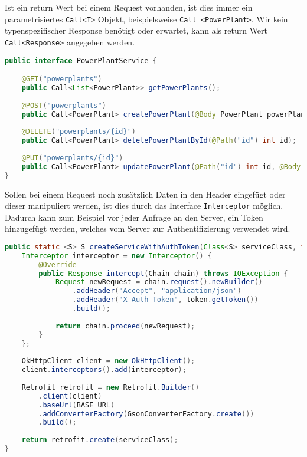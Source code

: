 Ist ein return Wert bei einem Request vorhanden, ist dies immer ein parametrisiertes \texttt{Call<T>} Objekt, beispielsweise \texttt{Call <PowerPlant>}. Wir kein typenspezifischer Response benötigt oder erwartet, kann als return Wert \texttt{Call<Response>} angegeben werden.
 
\begin{lstlisting}[language=java, caption={Auszug aus dem PowerPlantService},label={lst:retrofitPowerPlantService}, escapechar=|, numbers=none, frame=single]
public interface PowerPlantService {

	@GET("powerplants")
	public Call<List<PowerPlant>> getPowerPlants();
	
	@POST("powerplants")
	public Call<PowerPlant> createPowerPlant(@Body PowerPlant powerPlant);
	
	@DELETE("powerplants/{id}")
	public Call<PowerPlant> deletePowerPlantById(@Path("id") int id); |\label{line:path}|
	
	@PUT("powerplants/{id}")
	public Call<PowerPlant> updatePowerPlant(@Path("id") int id, @Body PowerPlant powerPlant); |\label{line:body}|
}
\end{lstlisting}

\newpage
Sollen bei einem Request noch zusätzlich Daten in den Header eingefügt oder dieser manipuliert werden, ist dies durch das Interface \texttt{Interceptor} möglich. Dadurch kann zum Beispiel vor jeder Anfrage an den Server, ein Token hinzugefügt werden, welches vom Server zur Authentifizierung verwendet wird.

\begin{lstlisting}[language=java, caption={Hinzufügen des Tokens, für gültigen Login},label={lst:addToken}, escapechar=|, frame=single]
public static <S> S createServiceWithAuthToken(Class<S> serviceClass, final AuthToken token) {
	Interceptor interceptor = new Interceptor() {
		@Override
		public Response intercept(Chain chain) throws IOException {
			Request newRequest = chain.request().newBuilder()
				.addHeader("Accept", "application/json")
				.addHeader("X-Auth-Token", token.getToken())
				.build();
		
			return chain.proceed(newRequest);
		}
	};
		
	OkHttpClient client = new OkHttpClient();
	client.interceptors().add(interceptor);
		
	Retrofit retrofit = new Retrofit.Builder()
		.client(client)
		.baseUrl(BASE_URL)
		.addConverterFactory(GsonConverterFactory.create())
		.build();
	
	return retrofit.create(serviceClass);
}
\end{lstlisting}

